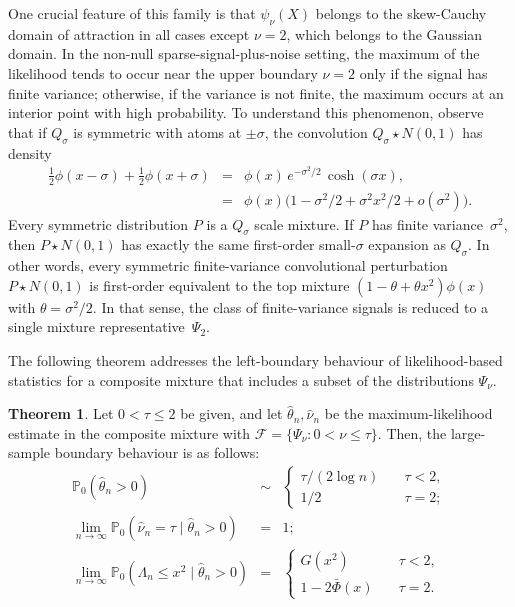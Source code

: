 \documentclass[11pt]{article}
\theoremstyle{definition}
\newtheorem{theorem}{Theorem}[section]
\def\Prob{{\mathbb P}}
\def\F{{\mathcal F}}
\def\vhalf{\textstyle{\frac 1 2}}
\def\given{\mid}
\begin{document}
One crucial feature of this family is that $\psi_\nu(X)$ belongs to the skew-Cauchy domain of attraction in all cases except $\nu=2$, which belongs to the Gaussian domain.  In the non-null sparse-signal-plus-noise setting, the maximum of the likelihood tends to occur near the upper boundary $\nu = 2$ only if the signal has finite variance; otherwise, if the variance is not finite, the maximum occurs at an interior point with high probability.  To understand this phenomenon, observe that if $Q_\sigma$ is symmetric with atoms at $\pm\sigma$, the convolution $Q_\sigma\star N(0,1)$ has density
\begin{eqnarray*}
	\vhalf\phi(x - \sigma) + \vhalf \phi(x+\sigma) &=& \phi(x)\, e^{-\sigma^2/2}\, \cosh(\sigma x) , \\
	&=& \phi(x) \bigl(1 - \sigma^2/2 + \sigma^2 x^2/2 + o(\sigma^2) \bigr).
\end{eqnarray*}
Every symmetric distribution $P$ is a $Q_\sigma$ scale mixture.  If $P$ has finite variance~$\sigma^2$, then $P\star N(0,1)$ has exactly the same first-order small-$\sigma$ expansion as $Q_\sigma$.
In other words, every symmetric finite-variance convolutional perturbation $P\star N(0, 1)$ is first-order equivalent to the top mixture  $(1 - \theta + \theta x^2)\phi(x)$ with $\theta = \sigma^2\!/2$.  
In that sense, the class of finite-variance signals is reduced to a single mixture representative~$\Psi_2$.

The following theorem addresses the left-boundary behaviour of likelihood-based statistics for a composite mixture that includes a subset of the distributions $\Psi_\nu$.

\begin{theorem}\label{thmExample}
	Let $0 <\tau \le 2$ be given,
	and let $\hat\theta_n, \hat\nu_n$ be the maximum-likelihood estimate in the composite mixture with $\F = \{\Psi_\nu \colon 0 < \nu \le\tau\}$.
	Then, the large-sample boundary behaviour is as follows:
	\begin{eqnarray*}
		\Prob_0(\hat\theta_n > 0) &\sim& \left\{\begin{array}{ll} \tau / (2\log n) &\quad \tau < 2, \\
			1/2 & \quad \tau = 2; \end{array} \right. \\ 
		\lim_{n \to\infty} \Prob_0(\hat\nu_n = \tau \given \hat\theta_n > 0) &=& 1;\\
		\lim_{n \to\infty} \Prob_0(\Lambda_n \le x^2 \given \hat\theta_n > 0) &=& 
		\left\{\begin{array}{ll} G(x^2) &\quad \tau < 2, \\
			1 - 2\bar\Phi(x) & \quad \tau = 2. \end{array} \right.
	\end{eqnarray*}
\end{theorem}
\end{document}
